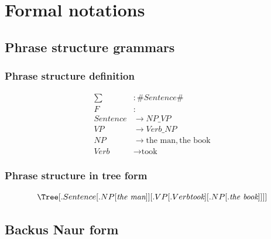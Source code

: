 \documentclass{beamer}
\begin{document}

\section{Formal notations} %

\subsection{Phrase structure grammars} %

\begin{frame}
	\frametitle{Phrase structure definition}
	\begin{equation} \label{eq1}
	\begin{split}
	\sum &: \# Sentence \# \\
	F&: \\ Sentence &\to NP\_VP \\
	VP &\to Verb\_NP \\
	NP &\to \text{the man}, \text{the book} \\
	Verb &\to \text{took}
	\end{split}
	\end{equation}
\end{frame}

\begin{frame}
\frametitle{Phrase structure in tree form}
\begin{equation} \label{eq2}
	\Tree[.Sentence [.NP [ \textit{the man} ]]
			  [.VP [.Verb \textit{took} ]
					[.NP [.\textit{the book} ]]]]
\end{equation}
\end{frame}


\subsection{Backus Naur form}
\end{document}

